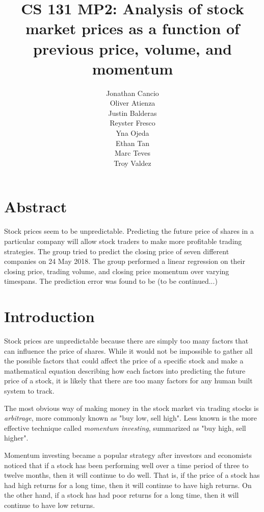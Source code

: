 \documentclass[8pt]{article}
\begin{document}
	\author{Jonathan Cancio \\ Oliver Atienza \\ Justin Balderas \\ 
	Reyster Fresco \\ Yna Ojeda \\ Ethan Tan \\ Marc Teves \\ Troy Valdez}
	\title{CS 131 MP2: Analysis of stock market prices as a function of previous price, volume, and momentum}
	\maketitle
	\section{Abstract}
	Stock prices seem to be unpredictable.
	Predicting the future price of shares in a particular company will allow stock traders to make more profitable trading strategies.
	The group tried to predict the closing price of seven different companies on 24 May 2018. 
	The group performed a linear regression on their closing price, trading volume, and closing price momentum over varying timespans.
	The prediction error was found to be (to be continued...)
	\section{Introduction}

	Stock prices are unpredictable because there are simply too many factors that can influence the price of shares.
	While it would not be impossible to gather all the possible factors that could affect the price of a specific stock and make a mathematical equation describing how each factors into predicting the future price of a stock, it is likely that there are too many factors for any human built system to track.

	The most obvious way of making money in the stock market via trading stocks is \textit{arbitrage}, more commonly known as "buy low, sell high".
	Less known is the more effective technique called \textit{momentum investing}, summarized as "buy high, sell higher". 

	Momentum investing became a popular strategy after investors and economists noticed that if a stock has been performing well over a time period of three to twelve months, then it will continue to do well.
	That is, if the price of a stock has had high returns for a long time, then it will continue to have high returns.
	On the other hand, if a stock has had poor returns for a long time, then it will continue to have low returns.
\end{document}
